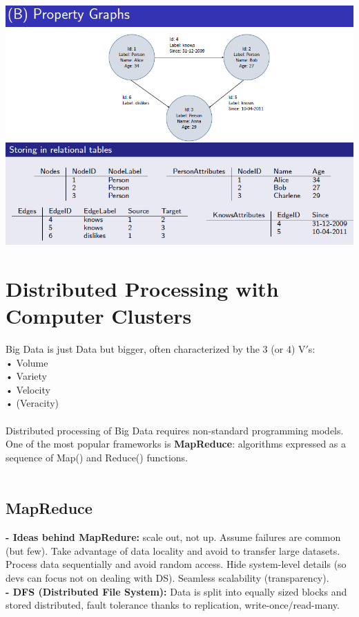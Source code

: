 \documentclass{article}
\begin{document}
\includegraphics[scale=0.6]{35.png}\\

\section{Distributed Processing with Computer Clusters}
Big Data is just Data but bigger, often characterized by the 3 (or 4) V$'$s:\\
• Volume\\
• Variety\\
• Velocity\\
• (Veracity)\\\\
Distributed processing of Big Data requires non-standard programming models. One of the most popular frameworks is \textbf{MapReduce}: algorithms expressed as a sequence of Map() and Reduce() functions.\\\\
\subsection{MapReduce}
\textbf{- Ideas behind MapRedure: }scale out, not up. Assume failures are common (but few). Take advantage of data locality and avoid to transfer large datasets. Process data sequentially and avoid random access. Hide system-level details (so devs can focus not on dealing with DS). Seamless scalability (transparency).\\
\textbf{- DFS (Distributed File System): }Data is split into equally sized blocks and stored distributed, fault tolerance thanks to replication, write-once$/$read-many.\\
\end{document}
